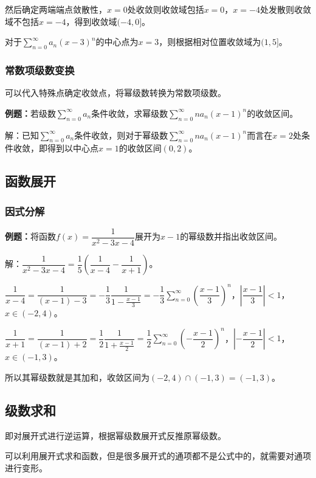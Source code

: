 \documentclass[UTF8, 12pt]{ctexart}
\begin{document}
然后确定两端端点敛散性，$x=0$处收敛则收敛域包括$x=0$，$x=-4$处发散则收敛域不包括$x=-4$，得到收敛域$(-4,0]$。

对于$\sum\limits_{n=0}^\infty a_n(x-3)^n$的中心点为$x=3$，则根据相对位置收敛域为$(1,5]$。

\subsubsection{常数项级数变换}

可以代入特殊点确定收敛点，将幂级数转换为常数项级数。

\textbf{例题：}若级数$\sum\limits_{n=0}^\infty a_n$条件收敛，求幂级数$\sum\limits_{n=0}^\infty na_n(x-1)^n$的收敛区间。

解：已知$\sum\limits_{n=0}^\infty a_n$条件收敛，则对于幂级数$\sum\limits_{n=0}^\infty na_n(x-1)^n$而言在$x=2$处条件收敛，即得到以中心点$x=1$的收敛区间$(0,2)$。

\subsection{函数展开}

\subsubsection{因式分解}

\textbf{例题：}将函数$f(x)=\dfrac{1}{x^2-3x-4}$展开为$x-1$的幂级数并指出收敛区间。

解：$\dfrac{1}{x^2-3x-4}=\dfrac{1}{5}\left(\dfrac{1}{x-4}-\dfrac{1}{x+1}\right)$。

$\dfrac{1}{x-4}=\dfrac{1}{(x-1)-3}=-\dfrac{1}{3}\dfrac{1}{1-\frac{x-1}{3}}=-\dfrac{1}{3}\sum\limits_{n=0}^\infty\left(\dfrac{x-1}{3}\right)^n$，$\left\vert\dfrac{x-1}{3}\right\vert<1$，$x\in(-2,4)$。

$\dfrac{1}{x+1}=\dfrac{1}{(x-1)+2}=\dfrac{1}{2}\dfrac{1}{1+\frac{x-1}{2}}=\dfrac{1}{2}\sum\limits_{n=0}^\infty\left(-\dfrac{x-1}{2}\right)^n$，$\left\vert-\dfrac{x-1}{2}\right\vert<1$，$x\in(-1,3)$。

所以其幂级数就是其加和，收敛区间为$(-2,4)\cap(-1,3)=(-1,3)$。

\subsection{级数求和}

即对展开式进行逆运算，根据幂级数展开式反推原幂级数。

可以利用展开式求和函数，但是很多展开式的通项都不是公式中的，就需要对通项进行变形。
\end{document}
